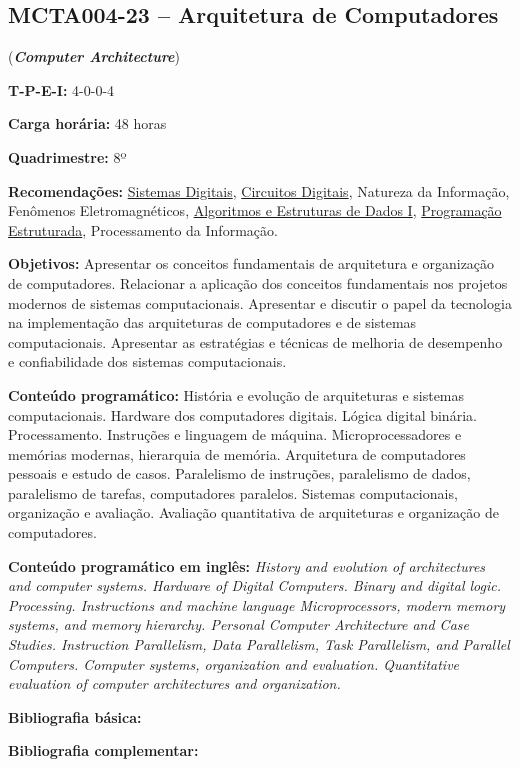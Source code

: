 \documentclass[class=article, crop=false]{standalone}
\begin{document}
\subsection{MCTA004-23 -- Arquitetura de Computadores}
\label{disc:arq}

(\textbf{\textit{Computer Architecture}})

\begin{center}
    \begin{minipage}{0.85\textwidth}
        \textbf{T-P-E-I:} 4-0-0-4
        
        \textbf{Carga horária:} 48 horas
        
        \textbf{Quadrimestre:} 8º
        
        \textbf{Recomendações:} 
        \hyperref[disc:sist_dig]{Sistemas Digitais},
        \hyperref[disc:circ_dig]{Circuitos Digitais},
        Natureza da Informação,
        Fenômenos Eletromagnéticos, 
        \hyperref[disc:aedI]{Algoritmos e Estruturas de Dados I},
        \hyperref[disc:pe]{Programação Estruturada},
        Processamento da Informação.
    \end{minipage}
\end{center}

\textbf{Objetivos:}
Apresentar os conceitos fundamentais de arquitetura e organização de
computadores.
Relacionar a aplicação dos conceitos fundamentais nos projetos modernos de
sistemas computacionais.
Apresentar e discutir o papel da tecnologia na implementação das arquiteturas
de computadores e de sistemas computacionais.
Apresentar as estratégias e técnicas de melhoria de desempenho e confiabilidade
dos sistemas computacionais.


\textbf{Conteúdo programático:}
História e evolução de arquiteturas e sistemas computacionais.
Hardware dos computadores digitais.
Lógica digital binária.
Processamento.
Instruções e linguagem de máquina.
Microprocessadores e memórias modernas, hierarquia de memória.
Arquitetura de computadores pessoais e estudo de casos.
Paralelismo de instruções, paralelismo de dados, paralelismo de tarefas,
computadores paralelos.
Sistemas computacionais, organização e avaliação.
Avaliação quantitativa de arquiteturas e organização de computadores.

\textbf{Conteúdo programático em inglês:} 
\textit{History and evolution of architectures and computer systems.
Hardware of Digital Computers.
Binary and digital logic. 
Processing.
Instructions and machine language
Microprocessors, modern memory systems, and memory hierarchy.
Personal Computer Architecture and Case Studies.
Instruction Parallelism, Data Parallelism, Task Parallelism, and Parallel Computers.
Computer systems, organization and evaluation.
Quantitative evaluation of computer architectures and organization.}

\newrefsection
\textbf{Bibliografia básica:}
\nocite{2010-stallings, 2013-tanenbaum, 2014-patterson}
\printbibliography

\newrefsection
\textbf{Bibliografia complementar:}
\nocite{2013-hennessy, 2021-nilsan, 2010-null, 2013-harris, 2005-dantas}
\printbibliography
\end{document}
